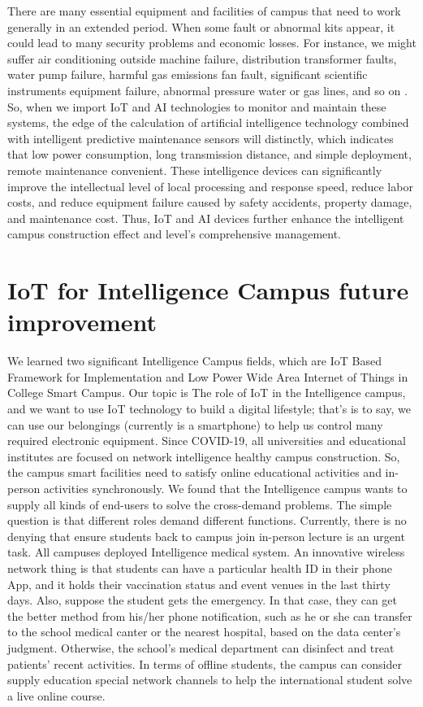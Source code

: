 \documentclass[conference]{IEEEtran}
\begin{document}
There are many essential equipment and facilities of campus that need to work generally in an extended period. When some fault or abnormal kits appear, it could lead to many security problems and economic losses. For instance, we might suffer air conditioning outside machine failure, distribution transformer faults, water pump failure, harmful gas emissions fan fault, significant scientific instruments equipment failure, abnormal pressure water or gas lines, and so on \cite{INTCAMPUS:SDN-BasedIOT}. So, when we import IoT and AI technologies to monitor and maintain these systems, the edge of the calculation of artificial intelligence technology combined with intelligent predictive maintenance sensors will distinctly, which indicates that low power consumption, long transmission distance, and simple deployment, remote maintenance convenient. These intelligence devices can significantly improve the intellectual level of local processing and response speed, reduce labor costs, and reduce equipment failure caused by safety accidents, property damage, and maintenance cost. Thus, IoT and AI devices further enhance the intelligent campus construction effect and level's comprehensive management.

\section{IoT for Intelligence Campus future improvement}
We learned two significant Intelligence Campus fields, which are IoT Based Framework for Implementation and Low Power Wide Area Internet of Things in College Smart Campus. Our topic is The role of IoT in the Intelligence campus, and we want to use IoT technology to build a digital lifestyle; that's is to say, we can use our belongings (currently is a smartphone) to help us control many required electronic equipment. Since COVID-19, all universities and educational institutes are focused on network intelligence healthy campus construction. So, the campus smart facilities need to satisfy online educational activities and in-person activities synchronously. We found that the Intelligence campus wants to supply all kinds of end-users to solve the cross-demand problems. The simple question is that different roles demand different functions. Currently, there is no denying that ensure students back to campus join in-person lecture is an urgent task. All campuses deployed Intelligence medical system. An innovative wireless network thing is that students can have a particular health ID in their phone App, and it holds their vaccination status and event venues in the last thirty days. Also, suppose the student gets the emergency. In that case, they can get the better method from his/her phone notification, such as he or she can transfer to the school medical canter or the nearest hospital, based on the data center's judgment. Otherwise, the school's medical department can disinfect and treat patients' recent activities. In terms of offline students, the campus can consider supply education special network channels to help the international student solve a live online course. 
\end{document}
